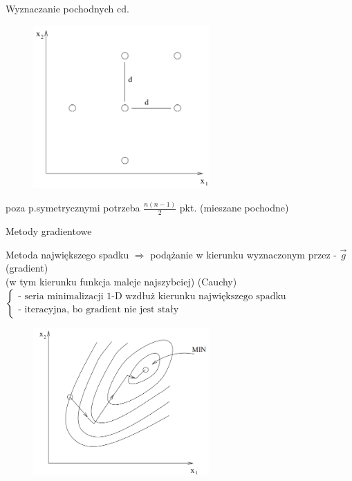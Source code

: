   \begin{frame}{Wyznaczanie pochodnych cd.}

    \begin{figure}
		\centering
		\includegraphics[height=0.6\textheight ,width=0.6\textwidth]{img/17/wyznaczanie_pochodnych}
	\end{figure}
    \begin{block}{}
      poza p.symetrycznymi potrzeba $\frac{n(n-1)}{2}$ pkt. (mieszane pochodne)
  	\end{block}

  \end{frame}

  \begin{frame}{Metody gradientowe}

    \begin{block}{Metoda największego spadku}
      $\Rightarrow$ podążanie w kierunku wyznaczonym przez - $\vec g$ (gradient)
      \\(w tym kierunku funkcja maleje najszybciej) (Cauchy)
      \\$\left\{
        \begin{array}{l}
          \text{- seria minimalizacji 1-D wzdłuż kierunku największego spadku} \\
          \text{- iteracyjna, bo gradient nie jest stały}
	    \end{array}
	  \right.$
  	\end{block}
    \begin{figure}
		\centering
		\includegraphics[height=0.5\textheight ,width=0.6\textwidth]{img/17/high_fall_met_1}
	\end{figure}

  \end{frame}

